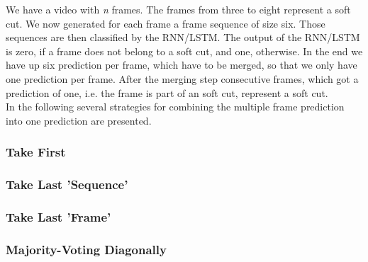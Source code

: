 We have a video with \textit{n} frames.
The frames from three to eight represent a soft cut.
We now generated for each frame a frame sequence of size six.
Those sequences are then classified by the RNN/LSTM.
The output of the RNN/LSTM is zero, if a frame does not belong to a soft cut, and one, otherwise.
In the end we have up six prediction per frame, which have to be merged, so that we only have one prediction per frame.
After the merging step consecutive frames, which got a prediction of one, i.e. the frame is part of an soft cut, represent a soft cut. \\
In the following several strategies for combining the multiple frame prediction into one prediction are presented.

\subsubsection{Take First}
\subsubsection{Take Last 'Sequence'}
\subsubsection{Take Last 'Frame'}
\subsubsection{Majority-Voting Diagonally}
